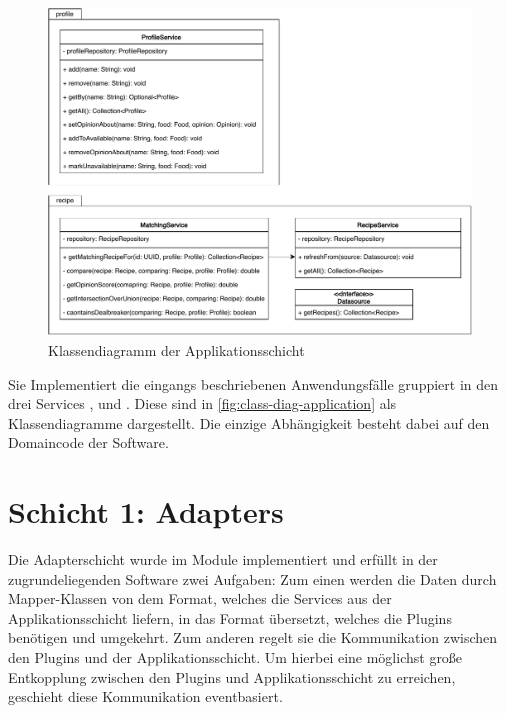 \begin{figure}[ht!]
    \includegraphics[width=0.98\columnwidth]{../diagrams/application_uml.pdf}
    \caption{Klassendiagramm der Applikationsschicht}
    \label{fig:class-diag-application}
\end{figure}

Sie Implementiert die eingangs beschriebenen Anwendungsfälle gruppiert in den drei Services ,  und . Diese sind in \autoref{fig:class-diag-application} als Klassendiagramme dargestellt. Die einzige Abhängigkeit besteht dabei auf den Domaincode der Software.

\section{Schicht 1: Adapters}
Die Adapterschicht wurde im Module  implementiert und erfüllt in der zugrundeliegenden Software zwei Aufgaben: Zum einen werden die Daten durch Mapper-Klassen von dem Format, welches die Services aus der Applikationsschicht liefern, in das Format übersetzt, welches die Plugins benötigen und umgekehrt. Zum anderen regelt sie die Kommunikation zwischen den Plugins und der Applikationsschicht. Um hierbei eine möglichst große Entkopplung zwischen den Plugins und Applikationsschicht zu erreichen, geschieht diese Kommunikation eventbasiert.

